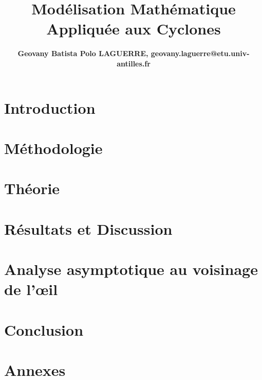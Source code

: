 \documentclass[a4paper,12pt]{book}
\title{Modélisation Mathématique Appliquée aux Cyclones}
\author{\textbf{Geovany Batista Polo LAGUERRE, geovany.laguerre@etu.univ-antilles.fr}}
\begin{document}
\maketitle



\tableofcontents

\chapter{Introduction}


\chapter{Méthodologie}


\chapter{Théorie}


\chapter{Résultats et Discussion}


\chapter{Analyse asymptotique au voisinage de l'œil}


\chapter{Conclusion}


\appendix
\chapter{Annexes}

\end{document}
